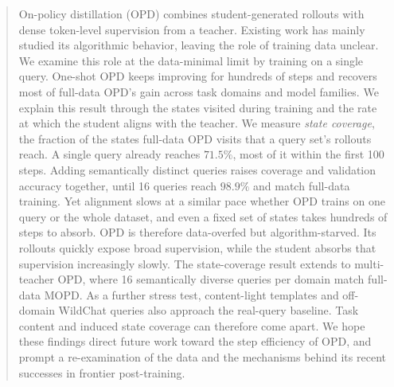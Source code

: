 \begin{abstract}
    On-policy distillation (OPD) combines student-generated rollouts with dense token-level supervision from a teacher. Existing work has mainly studied its algorithmic behavior, leaving the role of training data unclear. We examine this role at the data-minimal limit by training on a single query. One-shot OPD keeps improving for hundreds of steps and recovers most of full-data OPD's gain across task domains and model families. We explain this result through the states visited during training and the rate at which the student aligns with the teacher. We measure \emph{state coverage}, the fraction of the states full-data OPD visits that a query set's rollouts reach. A single query already reaches \(71.5\%\), most of it within the first 100 steps. Adding semantically distinct queries raises coverage and validation accuracy together, until 16 queries reach \(98.9\%\) and match full-data training. Yet alignment slows at a similar pace whether OPD trains on one query or the whole dataset, and even a fixed set of states takes hundreds of steps to absorb. OPD is therefore data-overfed but algorithm-starved. Its rollouts quickly expose broad supervision, while the student absorbs that supervision increasingly slowly. The state-coverage result extends to multi-teacher OPD, where 16 semantically diverse queries per domain match full-data MOPD. As a further stress test, content-light templates and off-domain WildChat queries also approach the real-query baseline. Task content and induced state coverage can therefore come apart. We hope these findings direct future work toward the step efficiency of OPD, and prompt a re-examination of the data and the mechanisms behind its recent successes in frontier post-training.

\end{abstract}
